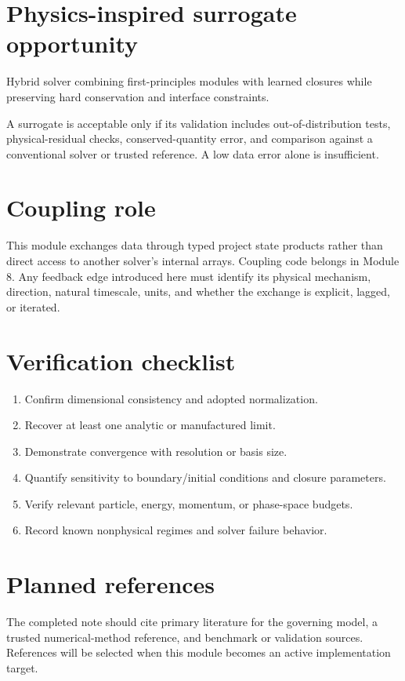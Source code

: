 \documentclass[11pt]{article}
\begin{document}
\section{Physics-inspired surrogate opportunity}
Hybrid solver combining first-principles modules with learned closures while preserving hard conservation and interface constraints.

A surrogate is acceptable only if its validation includes out-of-distribution tests, physical-residual checks, conserved-quantity error, and comparison against a conventional solver or trusted reference. A low data error alone is insufficient.

\section{Coupling role}
This module exchanges data through typed project state products rather than direct access to another solver's internal arrays. Coupling code belongs in Module 8. Any feedback edge introduced here must identify its physical mechanism, direction, natural timescale, units, and whether the exchange is explicit, lagged, or iterated.

\section{Verification checklist}
\begin{enumerate}[leftmargin=1.6em]
\item Confirm dimensional consistency and adopted normalization.
\item Recover at least one analytic or manufactured limit.
\item Demonstrate convergence with resolution or basis size.
\item Quantify sensitivity to boundary/initial conditions and closure parameters.
\item Verify relevant particle, energy, momentum, or phase-space budgets.
\item Record known nonphysical regimes and solver failure behavior.
\end{enumerate}

\section{Planned references}
The completed note should cite primary literature for the governing model, a trusted numerical-method reference, and benchmark or validation sources. References will be selected when this module becomes an active implementation target.
\end{document}
